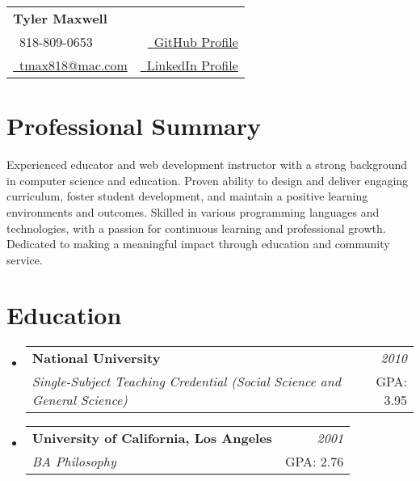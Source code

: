 \documentclass[a4paper,12pt]{article}
\makeatletter
\newcommand{\resumeSubheading}[4]{
\vspace{0.5mm}\item
    \begin{tabular*}{0.98\textwidth}[t]{l@{\extracolsep{\fill}}r}
        \textbf{#1} & \textit{\footnotesize{#4}} \\
        \textit{\footnotesize{#3}} &  \footnotesize{#2}\\
    \end{tabular*}
    \vspace{-2.4mm}
}
\newcommand{\resumeSubHeadingListStart}{\begin{itemize}[leftmargin=*,labelsep=0mm]}
\newcommand{\resumeSubHeadingListEnd}{\end{itemize}\vspace{2mm}}
\newcommand{\name}{Tyler Maxwell} %
\newcommand{\phone}{818-809-0653}
\newcommand{\emaila}{tmax818@mac.com}
\makeatother
\begin{document}
\selectfont


\parbox{\dimexpr\linewidth-0.3cm\relax}{
\begin{tabularx}{\linewidth}{L r} \\
  \textbf{\Large \name} \\ 
  {\raisebox{0.0\height}{\footnotesize \faPhone}\ \phone} & \href{https://github.com/tmax818}{\raisebox{0.0\height}{\footnotesize \faGithub}\ {GitHub Profile}}\\
  \href{mailto:\emaila}{\raisebox{0.0\height}{\footnotesize 
 \faEnvelope}\ {\emaila}}&\href{https://www.linkedin.com/in/tylermaxwell/}{\raisebox{0.0\height}{\footnotesize \faLinkedin}\ {LinkedIn Profile}}
\end{tabularx}
}


\section{\textbf{Professional Summary}}

Experienced educator and web development instructor with a strong background in computer science and education. Proven ability to design and deliver engaging curriculum, foster student development, and maintain a positive learning environments and outcomes. Skilled in various programming languages and technologies, with a passion for continuous learning and professional growth. Dedicated to making a meaningful impact through education and community service.

\section{\textbf{Education}}
  \resumeSubHeadingListStart
    \resumeSubheading
      {National University}{GPA: 3.95}
      {Single-Subject Teaching Credential (Social Science and General Science)}{2010}
    \resumeSubheading
      {University of California, Los Angeles}{GPA: 2.76}
      {BA Philosophy}{2001}
  \resumeSubHeadingListEnd
%

\end{document}
